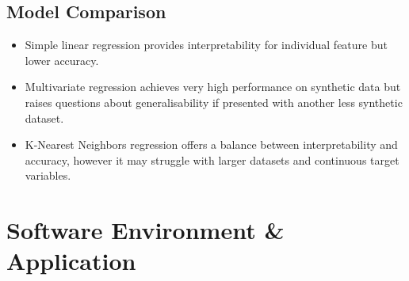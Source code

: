 \documentclass{article}
\begin{document}
\subsection{Model Comparison}

\begin{itemize}
\item Simple linear regression provides interpretability for individual feature but lower accuracy.
\item Multivariate regression achieves very high performance on synthetic data but raises questions about generalisability if presented with another less synthetic dataset.
\item K-Nearest Neighbors regression offers a balance between interpretability and accuracy, however it may struggle with larger datasets and continuous target variables.
\end{itemize}

\newpage
\section{Software Environment \& Application}
\end{document}

